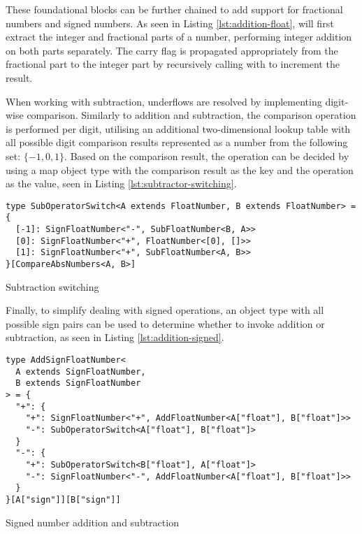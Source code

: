 These foundational blocks can be further chained to add support for fractional numbers and signed numbers. As seen in Listing \ref{lst:addition-float},  will first extract the integer and fractional parts of a number, performing integer addition on both parts separately. The carry flag is propagated appropriately from the fractional part to the integer part by recursively calling  with \vcode{[1]} to increment the result.

When working with subtraction, underflows are resolved by implementing digit-wise comparison. Similarly to addition and subtraction, the comparison operation is performed per digit, utilising an additional two-dimensional lookup table with all possible digit comparison results represented as a number from the following set: $\{ -1, 0, 1 \}$. Based on the comparison result, the operation can be decided by using a map object type with the comparison result as the key and the operation as the value, seen in Listing \ref{lst:subtractor-switching}.

\begin{listing}[ht!]
  \begin{verbatim}
type SubOperatorSwitch<A extends FloatNumber, B extends FloatNumber> = {
  [-1]: SignFloatNumber<"-", SubFloatNumber<B, A>>
  [0]: SignFloatNumber<"+", FloatNumber<[0], []>>
  [1]: SignFloatNumber<"+", SubFloatNumber<A, B>>
}[CompareAbsNumbers<A, B>]
\end{verbatim}
  \caption{Subtraction switching}\label{lst:subtractor-switching}
\end{listing}

Finally, to simplify dealing with signed operations, an object type with all possible sign pairs can be used to determine whether to invoke addition or subtraction, as seen in Listing \ref{lst:addition-signed}.

\begin{listing}[ht]
  \begin{verbatim}
type AddSignFloatNumber<
  A extends SignFloatNumber,
  B extends SignFloatNumber
> = {
  "+": {
    "+": SignFloatNumber<"+", AddFloatNumber<A["float"], B["float"]>>
    "-": SubOperatorSwitch<A["float"], B["float"]>
  }
  "-": {
    "+": SubOperatorSwitch<B["float"], A["float"]>
    "-": SignFloatNumber<"-", AddFloatNumber<A["float"], B["float"]>>
  }
}[A["sign"]][B["sign"]]
\end{verbatim}
  \caption{Signed number addition and subtraction}\label{lst:addition-signed}
\end{listing}

